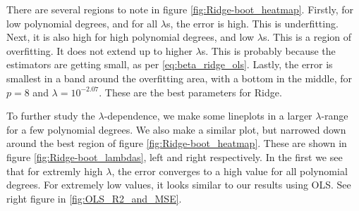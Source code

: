 \documentclass[reprint,english,notitlepage,aps,nobalancelastpage,nofootinbib]{revtex4-1}  %
\begin{document}
There are several regions to note in figure \ref{fig:Ridge-boot_heatmap}. Firstly, for low polynomial degrees, and for all $\lambda$s, the error is high. This is underfitting. Next, it is also high for high polynomial degrees, and low $\lambda$s. This is a region of overfitting. It does not extend up to higher $\lambda$s. This is probably because the estimators are getting small, as per \eqref{eq:beta_ridge_ols}. Lastly, the error is smallest in a band around the overfitting area, with a bottom in the middle, for $p=8$ and $\lambda=10^{-2.07}$. These are the best parameters for Ridge.

To further study the $\lambda$-dependence, we make some lineplots in a larger $\lambda$-range for a few polynomial degrees. We also make a similar plot, but narrowed down around the best region of figure \ref{fig:Ridge-boot_heatmap}. These are shown in figure \ref{fig:Ridge-boot_lambdas}, left and right respectively. In the first we see that for extremly high $\lambda$, the error converges to a high value for all polynomial degrees.  For extremely low values, it looks similar to our results using OLS. See right figure in \ref{fig:OLS_R2_and_MSE}.
\end{document}
